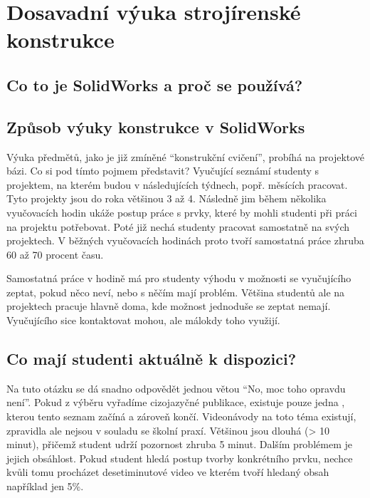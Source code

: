 \chapter{Dosavadní výuka strojírenské konstrukce}
\fxnote[inline=true]{\textcolor{mygreen}{Tato sekce je ještě částečně rozpracovaná, možná ji ještě přeformuluji celou}}

\section{Co to je SolidWorks a proč se používá?}

\section{Způsob výuky konstrukce v SolidWorks}
    Výuka předmětů, jako je již zmíněné \enquote{konstrukční cvičení}, probíhá na projektové bázi.
    Co si pod tímto pojmem představit?
    Vyučující seznámí studenty s projektem, na kterém budou v následujících týdnech, popř. měsících pracovat. 
    Tyto projekty jsou do roka většinou 3 až 4.
    Následně jim během několika vyučovacích hodin ukáže postup práce s prvky, které by mohli studenti při práci na projektu potřebovat.
    Poté již nechá studenty pracovat samostatně na svých projektech.
    V běžných vyučovacích hodinách proto tvoří samostatná práce zhruba 60 až 70 procent času.

    Samostatná práce v hodině má pro studenty výhodu v možnosti se vyučujícího zeptat, pokud něco neví, nebo s něčím mají problém.
    Většina studentů ale na projektech pracuje hlavně doma, kde možnost jednoduše se zeptat nemají.
    Vyučujícího sice kontaktovat mohou, ale málokdy toho využijí.

\section{Co mají studenti aktuálně k dispozici?}
    Na tuto otázku se dá snadno odpovědět jednou větou \enquote{No, moc toho opravdu není}.
    Pokud z výběru vyřadíme cizojazyčné publikace, existuje pouze jedna , kterou tento seznam začíná a zároveň končí. 
    Videonávody na toto téma existují, zpravidla ale nejsou v souladu se školní praxí.
    Většinou jsou dlouhá (> 10 minut), přičemž student udrží pozornost zhruba 5 minut.
    Dalším problémem je jejich obsáhlost.
    Pokud student hledá postup tvorby konkrétního prvku, nechce kvůli tomu procházet desetiminutové video ve kterém tvoří hledaný obsah například jen 5\%. 
